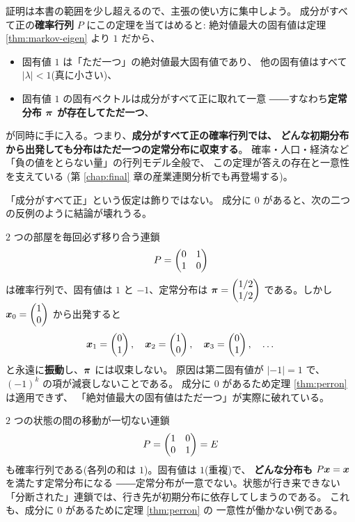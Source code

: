 証明は本書の範囲を少し超えるので、主張の使い方に集中しよう。
成分がすべて正の\textbf{確率行列} $P$ にこの定理を当てはめると:
絶対値最大の固有値は定理 \ref{thm:markov-eigen} より $1$ だから、
\begin{itemize}
\item 固有値 $1$ は「ただ一つ」の絶対値最大固有値であり、
他の固有値はすべて $|\lambda| < 1$(真に小さい)、
\item 固有値 $1$ の固有ベクトルは成分がすべて正に取れて一意
――すなわち\textbf{定常分布 $\bm{\pi}$ が存在してただ一つ}、
\end{itemize}
が同時に手に入る。つまり、\textbf{成分がすべて正の確率行列では、
どんな初期分布から出発しても分布はただ一つの定常分布に収束する}。
確率・人口・経済など「負の値をとらない量」の行列モデル全般で、
この定理が答えの存在と一意性を支えている
(第 \ref{chap:final} 章の産業連関分析でも再登場する)。

「成分がすべて正」という仮定は飾りではない。
成分に $0$ があると、次の二つの反例のように結論が壊れうる。

\begin{hanrei}\label{hanrei:markov-period}
$2$ つの部屋を毎回必ず移り合う連鎖
\[
P = \begin{pmatrix}0 & 1 \\ 1 & 0\end{pmatrix}
\]
は確率行列で、固有値は $1$ と $-1$、定常分布は
$\bm{\pi} = \begin{pmatrix}1/2 \\ 1/2\end{pmatrix}$ である。しかし
$\bm{x}_0 = \begin{pmatrix}1 \\ 0\end{pmatrix}$ から出発すると
\[
\bm{x}_1 = \begin{pmatrix}0 \\ 1\end{pmatrix}, \quad \bm{x}_2 = \begin{pmatrix}1 \\ 0\end{pmatrix}, \quad
\bm{x}_3 = \begin{pmatrix}0 \\ 1\end{pmatrix}, \quad \dots
\]
と永遠に\textbf{振動}し、$\bm{\pi}$ には収束しない。
原因は第二固有値が $|-1| = 1$ で、$(-1)^k$ の項が減衰しないことである。
成分に $0$ があるため定理 \ref{thm:perron} は適用できず、
「絶対値最大の固有値はただ一つ」が実際に破れている。
\end{hanrei}

\begin{hanrei}\label{hanrei:markov-reducible}
$2$ つの状態の間の移動が一切ない連鎖
\[
P = \begin{pmatrix}1 & 0 \\ 0 & 1\end{pmatrix} = E
\]
も確率行列である(各列の和は $1$)。固有値は $1$(重複)で、
\textbf{どんな分布も} $P\bm{x} = \bm{x}$ を満たす定常分布になる
――定常分布が一意でない。状態が行き来できない
「分断された」連鎖では、行き先が初期分布に依存してしまうのである。
これも、成分に $0$ があるために定理 \ref{thm:perron} の
一意性が働かない例である。
\end{hanrei}


